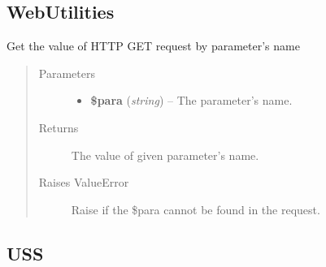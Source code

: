 \documentclass[letterpaper,10pt,english]{sphinxmanual}
\begin{document}
\subsection{WebUtilities}
\label{docs/api:webutilities}

\begin{fulllineitems}
\label{docs/api:GetParameter}
Get the value of HTTP GET request by parameter's name
\begin{quote}\begin{description}
\item[{Parameters}] \leavevmode\begin{itemize}
\item {} 
\textbf{\$para} (\emph{string}) -- The parameter's name.

\end{itemize}

\item[{Returns}] \leavevmode
The value of given parameter's name.

\item[{Raises ValueError}] \leavevmode
Raise if the \$para cannot be found in the request.

\end{description}\end{quote}

\end{fulllineitems}



\subsection{USS}
\label{docs/api:uss}
\end{document}
